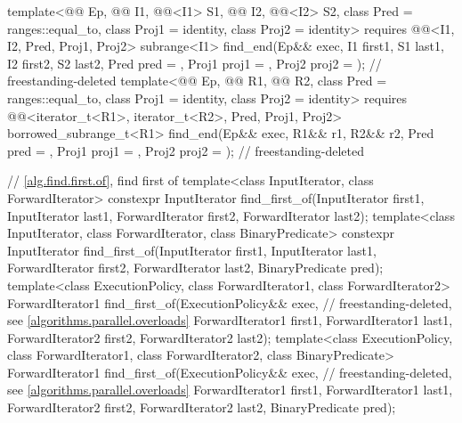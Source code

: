 \begin{codeblock}
{{    template<@@ Ep, @@ I1, @@<I1> S1,
             @@ I2, @@<I2> S2,
             class Pred = ranges::equal_to, class Proj1 = identity, class Proj2 = identity>
      requires @@<I1, I2, Pred, Proj1, Proj2>
      subrange<I1>
        find_end(Ep&& exec, I1 first1, S1 last1, I2 first2, S2 last2, Pred pred = {},
                 Proj1 proj1 = {}, Proj2 proj2 = {});           // freestanding-deleted
    template<@@ Ep, @@ R1, @@ R2,
             class Pred = ranges::equal_to, class Proj1 = identity, class Proj2 = identity>
      requires @@<iterator_t<R1>, iterator_t<R2>, Pred, Proj1, Proj2>
      borrowed_subrange_t<R1>
        find_end(Ep&& exec, R1&& r1, R2&& r2, Pred pred = {},
                 Proj1 proj1 = {}, Proj2 proj2 = {});           // freestanding-deleted
  }

  // \ref{alg.find.first.of}, find first of
  template<class InputIterator, class ForwardIterator>
    constexpr InputIterator
      find_first_of(InputIterator first1, InputIterator last1,
                    ForwardIterator first2, ForwardIterator last2);
  template<class InputIterator, class ForwardIterator, class BinaryPredicate>
    constexpr InputIterator
      find_first_of(InputIterator first1, InputIterator last1,
                    ForwardIterator first2, ForwardIterator last2,
                    BinaryPredicate pred);
  template<class ExecutionPolicy, class ForwardIterator1, class ForwardIterator2>
    ForwardIterator1
      find_first_of(ExecutionPolicy&& exec,                     // freestanding-deleted, see \ref{algorithms.parallel.overloads}
                    ForwardIterator1 first1, ForwardIterator1 last1,
                    ForwardIterator2 first2, ForwardIterator2 last2);
  template<class ExecutionPolicy, class ForwardIterator1,
           class ForwardIterator2, class BinaryPredicate>
    ForwardIterator1
      find_first_of(ExecutionPolicy&& exec,                     // freestanding-deleted, see \ref{algorithms.parallel.overloads}
                    ForwardIterator1 first1, ForwardIterator1 last1,
                    ForwardIterator2 first2, ForwardIterator2 last2,
                    BinaryPredicate pred);

}
\end{codeblock}
